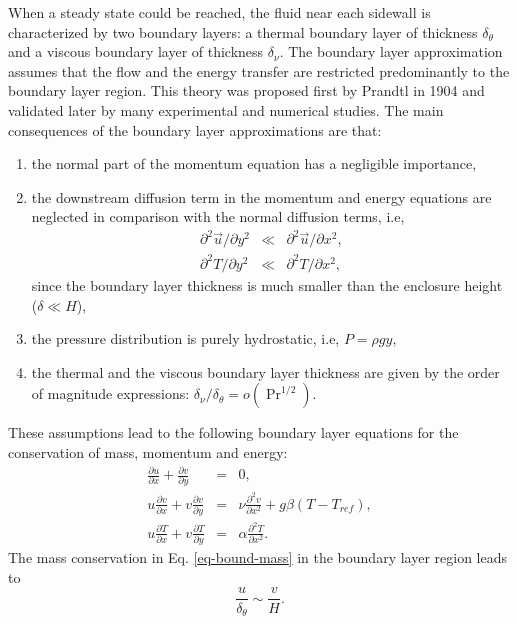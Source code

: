 When a steady state could be reached, the fluid near each sidewall is characterized by two boundary layers: a thermal boundary layer of thickness $\delta_{\theta}$ and a viscous boundary layer of thickness $\delta_\nu$.
The boundary layer approximation assumes that the flow and the energy transfer are restricted predominantly to the boundary layer region.
This theory was proposed first by Prandtl in 1904 and validated later by many experimental and numerical studies.
The main consequences of the boundary layer approximations are that:
\begin{enumerate}[label=(\roman*)]
\item the normal part of the momentum equation has a negligible importance,
\item the downstream diffusion term in the momentum and energy equations are neglected in comparison with the normal diffusion terms, i.e,
\begin{eqnarray}
\partial^2 \vec{u}/\partial y^2 & \ll & \partial^2 \vec{u}/\partial x^2, \\
\partial^2 T/\partial y^2 & \ll & \partial^2 T/\partial x^2,
\end{eqnarray}
since the boundary layer thickness is much smaller than the enclosure height ($ \delta \ll H$),
\item the pressure distribution is purely hydrostatic, i.e, $P = \rho g y$,
\item the thermal and the viscous boundary layer thickness are given by the order of magnitude expressions: $\delta_\nu/\delta_\theta = o \left(\Pr^{1/2} \right)$.
\end{enumerate}
These assumptions lead to the following boundary layer equations for the conservation of mass, momentum and energy:
\begin{eqnarray} \label{eq-bound-mass}
	\frac{\partial u}{\partial x} + \frac{\partial v}{\partial y} &=& 0, \\  \label{eq-bound-mom}
	u \frac{\partial v}{\partial x} + v \frac{\partial v}{\partial y} &=& \nu \frac{\partial^2 v}{\partial x^2} + g \beta (T - T_{ref}), \\ \label{eq-bound-energy}
	u \frac{\partial T}{\partial x} + v \frac{\partial T}{\partial y} &=& \alpha \frac{\partial^2 T}{\partial x^2}. 
\end{eqnarray}
The mass conservation in Eq. \ref{eq-bound-mass} in the boundary layer region leads to
\begin{equation}
	\frac{u}{\delta_\theta} \sim \frac{v}{H}.
\end{equation}
